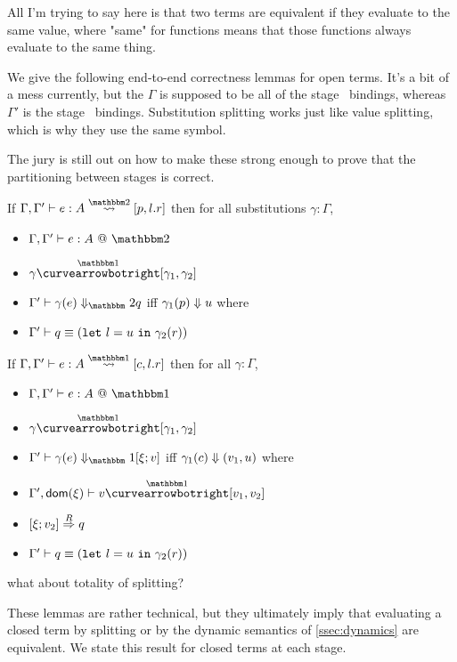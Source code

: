 All I'm trying to say here is that two terms are equivalent if they evaluate to the same value,
where "same" for functions means that those functions always evaluate to the same thing.

We give the following end-to-end correctness lemmas for open terms. 
It's a bit of a mess currently, but the $\Gamma$ is supposed to be all of the stage \bbone\ bindings, 
whereas $\Gamma'$ is the stage \bbtwo\ bindings.
Substitution splitting works just like value splitting, which is why they use the same symbol.

The jury is still out on how to make these strong enough to prove that the partitioning between stages is correct.

\begin{lemma}
If $\Gamma, \Gamma'\vdash e : A \splittwosym [p,l.r]$ then for all substitutions $\gamma : \Gamma$,
\begin{itemize}
\item $\Gamma,\Gamma' \vdash e : A~@~\bbtwo$ 
\item $\gamma \vsplito [\gamma_1, \gamma_2]$
\item $\diatwo [\Gamma'] {\gamma(e)} q$ iff ${\gamma_1(p)} \Downarrow {u}$ where
\item $\Gamma' \vdash q \equiv ({\tt let}~{l} = {u}~{\tt in}~{\gamma_2(r)})$
\end{itemize}
\end{lemma}

\begin{lemma}
If $\Gamma, \Gamma'\vdash e : A \splitonesym [c,l.r]$ then for all $\gamma : \Gamma$,
\begin{itemize}
\item $\typesone [\Gamma, \Gamma'] e A$ 
\item $\gamma \vsplito [\gamma_1, \gamma_2]$
\item $\diaone [\Gamma'] {\gamma(e)} {\xi;v}$ iff ${\gamma_1(c)} \Downarrow {(v_1,u)}$ where
\item $\Gamma',\dom \xi \vdash v \vsplito [v_1,v_2]$
\item $[{\xi};{v_2}]\overset{R}\Rightarrow{q}$
\item $\Gamma'\vdash q \equiv ({\tt let}~{l} = {u}~{\tt in}~{\gamma_2(r)})$
\end{itemize}
\end{lemma}

\TODO what about totality of splitting?

These lemmas are rather technical, but they ultimately imply that evaluating a
closed term by splitting or by the dynamic semantics of \ref{ssec:dynamics} are
equivalent. 
We state this result for closed terms at each stage.

